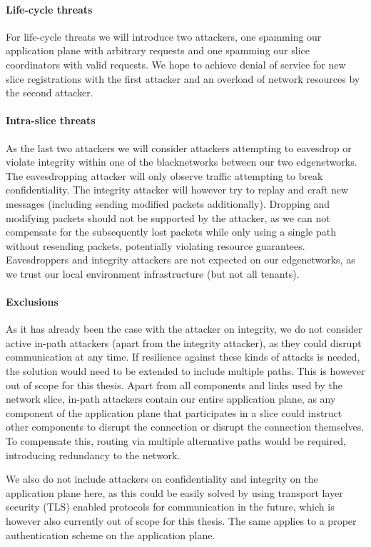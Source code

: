\paragraph{Life-cycle threats} For life-cycle threats we will introduce two attackers, one spamming our application plane with arbitrary requests and one spamming our slice coordinators with valid requests. We hope to achieve denial of service for new slice registrations with the first attacker and an overload of network resources by the second attacker.

\paragraph{Intra-slice threats} As the last two attackers we will consider attackers attempting to eavesdrop or violate integrity within one of the \gls{blacknetwork}s between our two \gls{edgenetwork}s. The eavesdropping attacker will only observe traffic attempting to break confidentiality. The integrity attacker will however try to replay and craft new messages (including sending modified packets additionally). Dropping and modifying packets should not be supported by the attacker, as we can not compensate for the subsequently lost packets while only using a single path without resending packets, potentially violating resource guarantees. Eavesdroppers and integrity attackers are not expected on our \gls{edgenetwork}s, as we trust our local environment infrastructure (but not all tenants).

\paragraph{Exclusions} As it has already been the case with the attacker on integrity, we do not consider active in-path attackers (apart from the integrity attacker), as they could disrupt communication at any time. If resilience against these kinds of attacks is needed, the solution would need to be extended to include multiple paths. This is however out of scope for this thesis. Apart from all components and links used by the network slice, in-path attackers contain our entire application plane, as any component of the application plane that participates in a slice could instruct other components to disrupt the connection or disrupt the connection themselves. To compensate this, routing via multiple alternative paths would be required, introducing redundancy to the network.

We also do not include attackers on confidentiality and integrity on the application plane here, as this could be easily solved by using transport layer security (TLS) enabled protocols for communication in the future, which is however also currently out of scope for this thesis. The same applies to a proper authentication scheme on the application plane.

